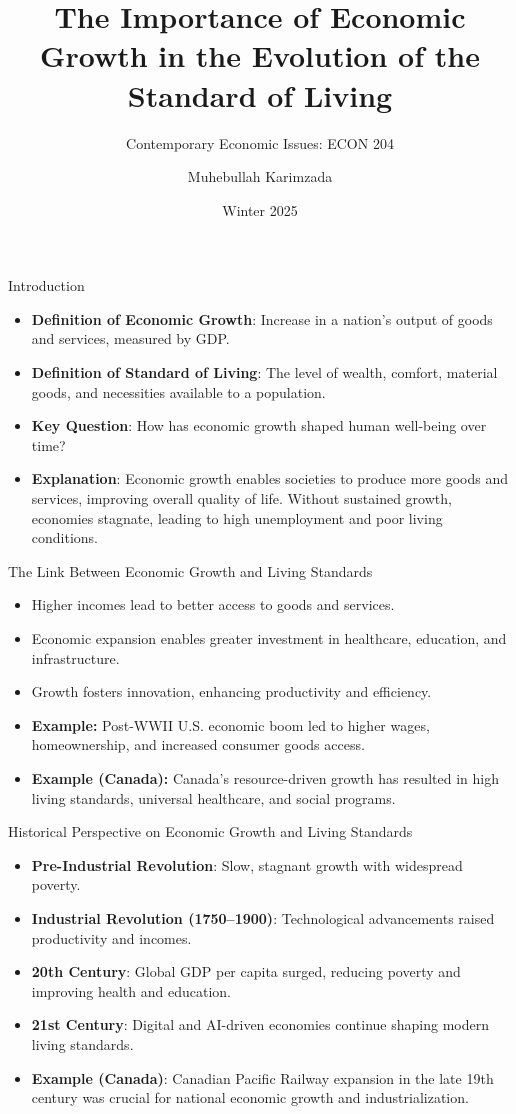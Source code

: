 \documentclass{beamer}
\title{The Importance of Economic Growth in the Evolution of the Standard of Living}
\subtitle{Contemporary Economic Issues: ECON 204}
\author{Muhebullah Karimzada}
\date{Winter 2025}
\begin{document}
\frame{\titlepage}

\begin{frame}{Introduction}
    \begin{itemize}
        \item \textbf{Definition of Economic Growth}: Increase in a nation’s output of goods and services, measured by GDP.
        \item \textbf{Definition of Standard of Living}: The level of wealth, comfort, material goods, and necessities available to a population.
        \item \textbf{Key Question}: How has economic growth shaped human well-being over time?
        \item \textbf{Explanation}: Economic growth enables societies to produce more goods and services, improving overall quality of life. Without sustained growth, economies stagnate, leading to high unemployment and poor living conditions.
    \end{itemize}
\end{frame}

\begin{frame}{The Link Between Economic Growth and Living Standards}
    \begin{itemize}
        \item Higher incomes lead to better access to goods and services.
        \item Economic expansion enables greater investment in healthcare, education, and infrastructure.
        \item Growth fosters innovation, enhancing productivity and efficiency.
        \item \textbf{Example:} Post-WWII U.S. economic boom led to higher wages, homeownership, and increased consumer goods access.
        \item \textbf{Example (Canada):} Canada's resource-driven growth has resulted in high living standards, universal healthcare, and social programs.
    \end{itemize}
\end{frame}

\begin{frame}{Historical Perspective on Economic Growth and Living Standards}
    \begin{itemize}
        \item \textbf{Pre-Industrial Revolution}: Slow, stagnant growth with widespread poverty.
        \item \textbf{Industrial Revolution (1750–1900)}: Technological advancements raised productivity and incomes.
        \item \textbf{20th Century}: Global GDP per capita surged, reducing poverty and improving health and education.
        \item \textbf{21st Century}: Digital and AI-driven economies continue shaping modern living standards.
        \item \textbf{Example (Canada)}: Canadian Pacific Railway expansion in the late 19th century was crucial for national economic growth and industrialization.
    \end{itemize}
\end{frame}
\end{document}
